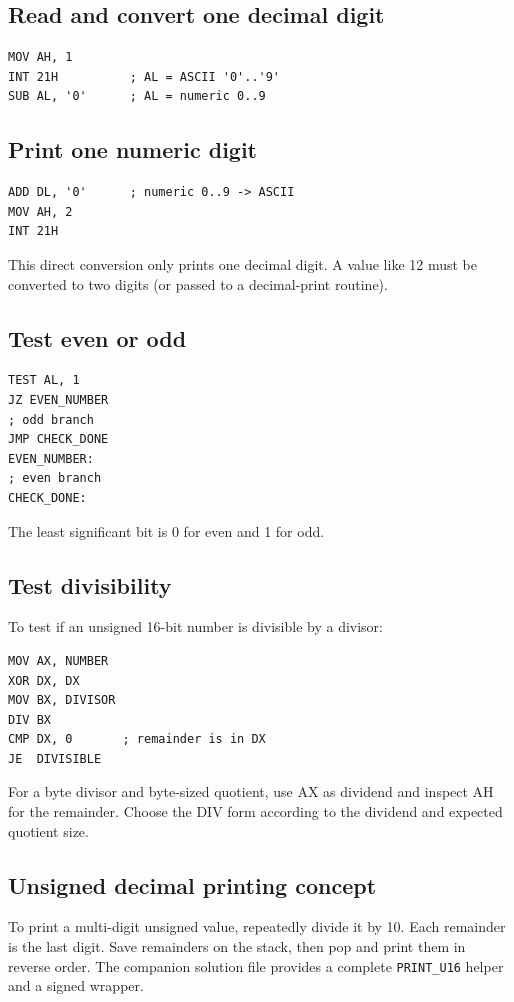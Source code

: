 \documentclass[11pt,a4paper]{article}
\begin{document}
\subsection{Read and convert one decimal digit}
\begin{lstlisting}[style=asm]
MOV AH, 1
INT 21H          ; AL = ASCII '0'..'9'
SUB AL, '0'      ; AL = numeric 0..9
\end{lstlisting}
\subsection{Print one numeric digit}
\begin{lstlisting}[style=asm]
ADD DL, '0'      ; numeric 0..9 -> ASCII
MOV AH, 2
INT 21H
\end{lstlisting}
This direct conversion only prints one decimal digit. A value like 12 must be converted to two digits (or passed to a decimal-print routine).

\subsection{Test even or odd}
\begin{lstlisting}[style=asm]
TEST AL, 1
JZ EVEN_NUMBER
; odd branch
JMP CHECK_DONE
EVEN_NUMBER:
; even branch
CHECK_DONE:
\end{lstlisting}
The least significant bit is 0 for even and 1 for odd.

\subsection{Test divisibility}
To test if an unsigned 16-bit number is divisible by a divisor:
\begin{lstlisting}[style=asm]
MOV AX, NUMBER
XOR DX, DX
MOV BX, DIVISOR
DIV BX
CMP DX, 0       ; remainder is in DX
JE  DIVISIBLE
\end{lstlisting}
For a byte divisor and byte-sized quotient, use AX as dividend and inspect AH for the remainder. Choose the DIV form according to the dividend and expected quotient size.

\subsection{Unsigned decimal printing concept}
To print a multi-digit unsigned value, repeatedly divide it by 10. Each remainder is the last digit. Save remainders on the stack, then pop and print them in reverse order. The companion solution file provides a complete \texttt{PRINT\_U16} helper and a signed wrapper.
\end{document}
